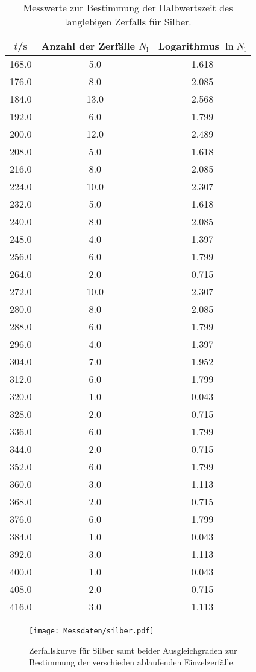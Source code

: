 \begin{table}
	\centering
	\caption{Messwerte zur Bestimmung der Halbwertszeit des langlebigen Zerfalls für Silber.}
	\label{tab:silver2}
\begin{tabular}{ccc}
	\toprule
$t$/$\si{\second}$ & Anzahl der Zerfälle $N_\mathrm{l}$ & Logarithmus $\ln{N_\mathrm{l}}$ \\
\midrule
168.0 & 5.0 & 1.618 \\
176.0 & 8.0 & 2.085 \\
184.0 & 13.0 & 2.568 \\
192.0 & 6.0 & 1.799 \\
200.0 & 12.0 & 2.489 \\
208.0 & 5.0 & 1.618 \\
216.0 & 8.0 & 2.085 \\
224.0 & 10.0 & 2.307 \\
232.0 & 5.0 & 1.618 \\
240.0 & 8.0 & 2.085 \\
248.0 & 4.0 & 1.397 \\
256.0 & 6.0 & 1.799 \\
264.0 & 2.0 & 0.715 \\
272.0 & 10.0 & 2.307 \\
280.0 & 8.0 & 2.085 \\
288.0 & 6.0 & 1.799 \\
296.0 & 4.0 & 1.397 \\
304.0 & 7.0 & 1.952 \\
312.0 & 6.0 & 1.799 \\
320.0 & 1.0 & 0.043 \\
328.0 & 2.0 & 0.715 \\
336.0 & 6.0 & 1.799 \\
344.0 & 2.0 & 0.715 \\
352.0 & 6.0 & 1.799 \\
360.0 & 3.0 & 1.113 \\
368.0 & 2.0 & 0.715 \\
376.0 & 6.0 & 1.799 \\
384.0 & 1.0 & 0.043 \\
392.0 & 3.0 & 1.113 \\
400.0 & 1.0 & 0.043 \\
408.0 & 2.0 & 0.715 \\
416.0 & 3.0 & 1.113 \\
\bottomrule
\end{tabular}
\end{table}

\begin{figure}
  \centering
  \texttt{[image: Messdaten/silber.pdf]}
  \caption{Zerfallskurve für Silber samt beider Ausgleichgraden zur Bestimmung der verschieden ablaufenden Einzelzerfälle.}
  \label{fig:silber}
\end{figure}

